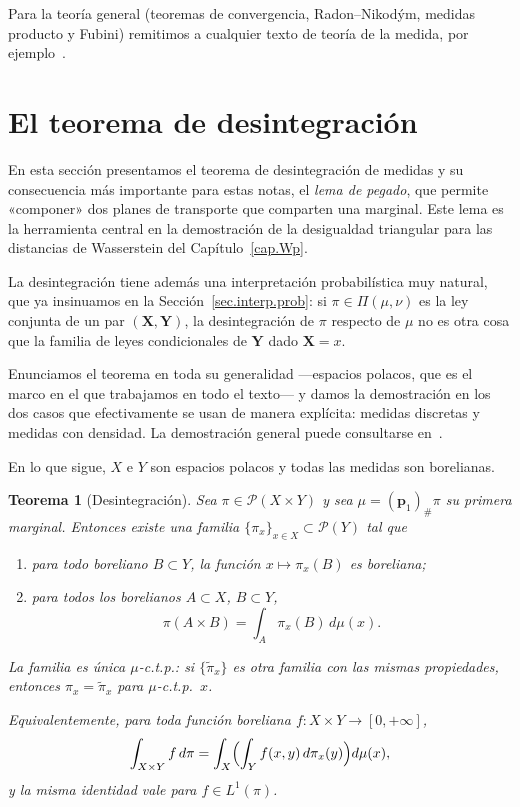\documentclass[12pt, a4paper]{amsbook}
\newcommand{\pp}{{\mathbf p}}
\newtheorem{teo}{Teorema}[section]
\theoremstyle{remark}
\theoremstyle{definition}
\numberwithin{section}{chapter}
\numberwithin{subsection}{section}
\numberwithin{equation}{section}
\numberwithin{figure}{chapter}
\begin{document}
Para la teoría general (teoremas de convergencia,
Radon--Nikodým, medidas producto y Fubini) remitimos a cualquier texto de
teoría de la medida, por ejemplo~\cite{Billingsley}.


\section{El teorema de desintegración}

En esta sección presentamos el teorema de desintegración de medidas y su
consecuencia más importante para estas notas, el \emph{lema de pegado}, que
permite «componer» dos planes de transporte que comparten una marginal. Este
lema es la herramienta central en la demostración de la desigualdad
triangular para las distancias de Wasserstein del Capítulo~\ref{cap.Wp}.

La desintegración tiene además una interpretación probabilística muy natural,
que ya insinuamos en la Sección~\ref{sec.interp.prob}: si $\pi\in\Pi(\mu,\nu)$ es la
ley conjunta de un par $(\mathbf X,\mathbf Y)$, la desintegración de $\pi$
respecto de $\mu$ no es otra cosa que la familia de leyes condicionales de
$\mathbf Y$ dado $\mathbf X=x$.

Enunciamos el teorema en toda su generalidad —espacios polacos, que es el marco
en el que trabajamos en todo el texto— y damos la demostración en los dos casos
que efectivamente se usan de manera explícita: medidas discretas y medidas con
densidad. La demostración general puede consultarse
en~\cite[Theorem~5.3.1]{AGS2008}.


En lo que sigue, $X$ e $Y$ son espacios polacos y todas las medidas
son borelianas.

\begin{teo}[Desintegración]\label{teo.desintegracion}
Sea $\pi\in\mathcal P(X\times Y)$ y sea $\mu=(\pp_1)_\#\pi$ su primera
marginal. Entonces existe una familia $\{\pi_x\}_{x\in X}\subset\mathcal P(Y)$
tal que
\begin{enumerate}
\item para todo boreliano $B\subset Y$, la función $x\mapsto\pi_x(B)$ es
boreliana;
\item para todos los borelianos $A\subset X$, $B\subset Y$,
\begin{equation}\label{eq:desint}
\pi(A\times B)=\int_A\pi_x(B)\,d\mu(x).
\end{equation}
\end{enumerate}
La familia es única $\mu$-c.t.p.: si $\{\widetilde\pi_x\}$ es otra familia con
las mismas propiedades, entonces $\pi_x=\widetilde\pi_x$ para $\mu$-c.t.p.\ $x$.

Equivalentemente, para toda función boreliana $f\colon X\times Y\to[0,+\infty]$,
\begin{equation}\label{eq:desint.int}
\int_{X\times Y}f\,d\pi
=
\int_X\Bigl(\int_Yf(x,y)\,d\pi_x(y)\Bigr)d\mu(x),
\end{equation}
y la misma identidad vale para $f\in L^1(\pi)$.
\end{teo}
\end{document}

